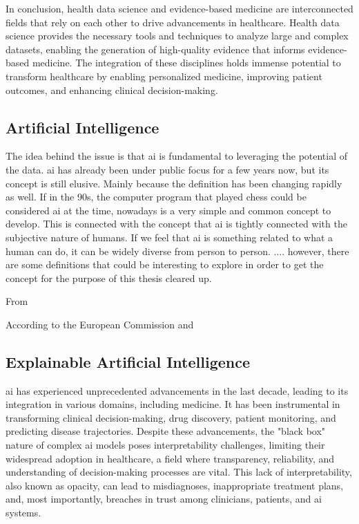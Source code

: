 In conclusion, health data science and evidence-based medicine are interconnected fields that rely on each other to drive advancements in healthcare. Health data science provides the necessary tools and techniques to analyze large and complex datasets, enabling the generation of high-quality evidence that informs evidence-based medicine. The integration of these disciplines holds immense potential to transform healthcare by enabling personalized medicine, improving patient outcomes, and enhancing clinical decision-making.



\subsection{Artificial Intelligence}
The idea behind the issue is that \ac{ai} is fundamental to leveraging the potential of the data. \ac{ai} has already been under public focus for a few years now, but its concept is still elusive. 
Mainly because the definition has been changing rapidly as well. If in the 90s, the computer program that played chess could be considered \ac{ai} at the time, nowadays is a very simple and common concept to develop. This is connected with the concept that \ac{ai} is tightly connected with the subjective nature of humans. If we feel that \ac{ai} is something related to what a human can do, it can be widely diverse from person to person.
....
however, there are some definitions that could be interesting to explore in order to get the concept for the purpose of this thesis cleared up.

From \cite{DBLP:books/aw/RN2020}

According to the European Commission \cite{DefinitionAIMain2019} and \cite{EthicsGuidelinesTrustworthy2019}




\subsection{Explainable Artificial Intelligence}\label{subsec:xai}
\ac{ai} has experienced unprecedented advancements in the last decade, leading to its integration in various domains, including medicine. It has been instrumental in transforming clinical decision-making, drug discovery, patient monitoring, and predicting disease trajectories. Despite these advancements, the "black box" nature of complex \ac{ai} models poses interpretability challenges, limiting their widespread adoption in healthcare, a field where transparency, reliability, and understanding of decision-making processes are vital. This lack of interpretability, also known as opacity, can lead to misdiagnoses, inappropriate treatment plans, and, most importantly, breaches in trust among clinicians, patients, and \ac{ai} systems.

